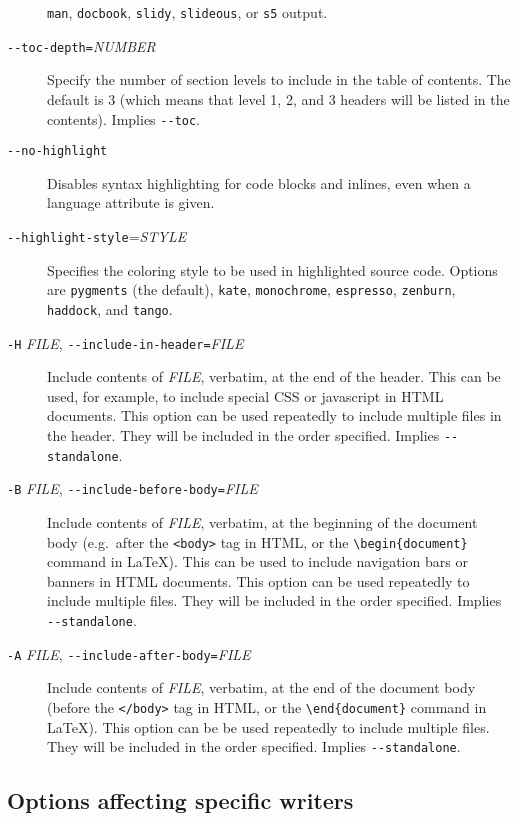 \documentclass[]{article}
\begin{document}
\begin{description}
\texttt{man}, \texttt{docbook}, \texttt{slidy}, \texttt{slideous}, or
\texttt{s5} output.
\item[\texttt{-{}-toc-depth=}\emph{NUMBER}]
Specify the number of section levels to include in the table of
contents. The default is 3 (which means that level 1, 2, and 3 headers
will be listed in the contents). Implies \texttt{-{}-toc}.
\item[\texttt{-{}-no-highlight}]
Disables syntax highlighting for code blocks and inlines, even when a
language attribute is given.
\item[\texttt{-{}-highlight-style}=\emph{STYLE}]
Specifies the coloring style to be used in highlighted source code.
Options are \texttt{pygments} (the default), \texttt{kate},
\texttt{monochrome}, \texttt{espresso}, \texttt{zenburn},
\texttt{haddock}, and \texttt{tango}.
\item[\texttt{-H} \emph{FILE},
\texttt{-{}-include-in-header=}\emph{FILE}]
Include contents of \emph{FILE}, verbatim, at the end of the header.
This can be used, for example, to include special CSS or javascript in
HTML documents. This option can be used repeatedly to include multiple
files in the header. They will be included in the order specified.
Implies \texttt{-{}-standalone}.
\item[\texttt{-B} \emph{FILE},
\texttt{-{}-include-before-body=}\emph{FILE}]
Include contents of \emph{FILE}, verbatim, at the beginning of the
document body (e.g.~after the \texttt{\textless{}body\textgreater{}} tag
in HTML, or the \texttt{\textbackslash{}begin\{document\}} command in
LaTeX). This can be used to include navigation bars or banners in HTML
documents. This option can be used repeatedly to include multiple files.
They will be included in the order specified. Implies
\texttt{-{}-standalone}.
\item[\texttt{-A} \emph{FILE},
\texttt{-{}-include-after-body=}\emph{FILE}]
Include contents of \emph{FILE}, verbatim, at the end of the document
body (before the \texttt{\textless{}/body\textgreater{}} tag in HTML, or
the \texttt{\textbackslash{}end\{document\}} command in LaTeX). This
option can be be used repeatedly to include multiple files. They will be
included in the order specified. Implies \texttt{-{}-standalone}.
\end{description}

\subsection{Options affecting specific writers}
\end{document}
